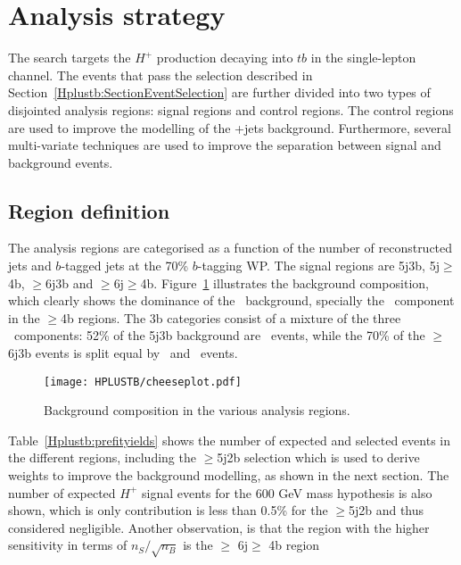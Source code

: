 \section{Analysis strategy}
The search targets the $H^+$ production decaying into $tb$ in the single-lepton channel. The events that pass the selection described in Section~\ref{Hplustb:SectionEventSelection} are further divided into two types of disjointed analysis regions: signal regions and control regions. The control regions are used to improve the modelling of the \ttbar+jets background. Furthermore, several multi-variate techniques are used to improve the separation between signal and background events.

\subsection{Region definition}

The analysis regions are categorised as a function of the number of reconstructed jets and $b$-tagged jets at the 70\% $b$-tagging WP. The signal regions are 5j3b, 5j$\geq$4b, $\geq$6j3b and $\geq$6j$\geq$4b. Figure~\ref{Hplustb:cheeseplots} illustrates the background composition, which clearly shows the dominance of the \ttbar\ background, specially the \ttb\ component in the $\geq$4b regions. The 3b categories consist of a mixture of the three \ttbar\ components: 52\% of the 5j3b background are \ttl\ events, while the 70\% of the $\geq$6j3b events is split equal by \ttb\ and \ttl\ events.

\begin{figure}[htbp]
    \RawFloats
    \begin{center}
    \texttt{[image: HPLUSTB/cheeseplot.pdf]}
    \caption{
        Background composition in the various analysis regions.
    }
    \label{Hplustb:cheeseplots}
    \end{center}
\end{figure}

Table~\ref{Hplustb:prefityields} shows the number of expected and selected events in the different regions, including the $\geq$5j2b selection which is used to derive weights to improve the background modelling, as shown in the next section. The number of expected $H^+$ signal events for the 600 GeV mass hypothesis is also shown, which is only contribution is less than 0.5\% for the $\geq$5j2b and thus considered negligible. Another observation, is that the region with the higher sensitivity in terms of $n_S/\sqrt{n_B}$ is the $\geq$ 6j$\geq$ 4b region  %

